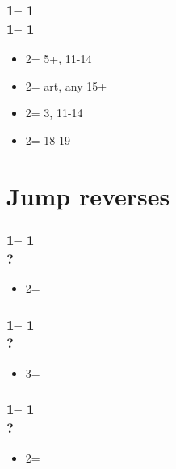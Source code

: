 \documentclass[12pt, a4paper]{report}
\begin{document}
{{        \subsubsection*{1\clubs -- 1\hearts\\
                        1\spades -- 1\nt\\}
        \begin{itemize}
            \item 2\clubs = 5+\clubs, 11-14
            \item 2\diams = art, any 15+ \unbal
            \item 2\hearts = 3\hearts, 11-14
            \item 2\nt = 18-19 \bal\ \gf
        \end{itemize}
    }

    \section*{\colorbox{blue!30}{Jump reverses}}
     {

        \subsubsection*{1\clubs -- 1\hearts\\
                        ?}
        \begin{itemize}
            \item 2\spades = \clubs\ \gf
        \end{itemize}

        \subsubsection*{1\clubs -- 1\spades\\
                        ?}
        \begin{itemize}
            \item 3\diams = \clubs\ \gf
        \end{itemize}

        \subsubsection*{1\diams -- 1\hearts\\
                        ?}
        \begin{itemize}
            \item 2\spades = \diams\ \gf
        \end{itemize}

}}
\end{document}
